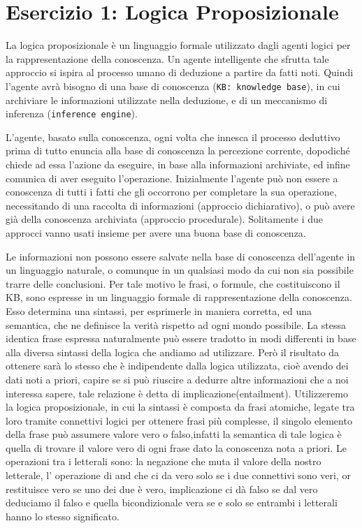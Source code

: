 \raggedright
{}
	\label{ch:cc}
	\section{Esercizio 1: Logica Proposizionale}
		\label{sec:es1}
		La logica proposizionale è un linguaggio formale utilizzato dagli agenti logici per la rappresentazione della conoscenza. Un agente intelligente che sfrutta tale approccio si ispira al processo umano di deduzione a partire da fatti noti. Quindi l'agente avrà bisogno di una base di conoscenza (\texttt{KB: knowledge base}), in cui archiviare le informazioni utilizzate nella deduzione, e di un meccanismo di inferenza (\texttt{inference engine}).
		\par
		L'agente, basato sulla conoscenza, ogni volta che innesca il processo deduttivo prima di tutto enuncia alla base di conoscenza la percezione corrente, dopodiché chiede ad essa l'azione da eseguire, in base alla informazioni archiviate, ed infine comunica  di aver eseguito l'operazione. Inizialmente l'agente può non essere a conoscenza di tutti i fatti che gli occorrono per completare la sua operazione, necessitando di una raccolta di informazioni (approccio dichiarativo), o può avere già della conoscenza archiviata (approccio procedurale). Solitamente i due approcci vanno usati insieme per avere una buona base di conoscenza.
		\par
		Le informazioni non possono essere salvate nella base di conoscenza dell'agente in un linguaggio naturale, o comunque in un qualsiasi modo da cui non sia possibile trarre delle conclusioni. Per tale motivo le frasi, o formule, che costituiscono il KB, sono espresse in un linguaggio formale di rappresentazione della conoscenza. Esso determina una sintassi, per esprimerle in maniera corretta, ed una semantica, che ne definisce la verità rispetto ad ogni mondo possibile. La stessa identica frase espressa naturalmente può essere tradotto in modi differenti in base alla diversa sintassi della logica che andiamo ad utilizzare. Però il risultato da ottenere sarà lo stesso che è indipendente dalla logica utilizzata, cioè avendo dei dati noti a priori, capire se si può riuscire a dedurre altre informazioni che a noi interessa sapere, tale relazione è detta di implicazione(entailment). Utilizzeremo la logica proposizionale, in cui la sintassi è composta da frasi atomiche, legate tra loro tramite connettivi logici per ottenere frasi più complesse, il singolo elemento della frase può assumere valore vero o falso,infatti la semantica di tale logica è quella di trovare il valore vero di ogni frase dato la conoscenza nota a priori. Le operazioni tra i letterali sono: la negazione che muta il valore della nostro letterale, l' operazione di and che ci da vero solo se i due connettivi sono veri, or restituisce vero se uno dei due è vero, implicazione ci dà falso se dal vero deduciamo il falso e quella bicondizionale vera se e solo se entrambi i letterali hanno lo stesso significato.
